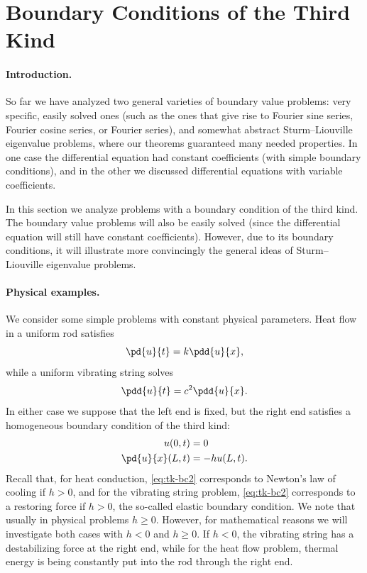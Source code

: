 \section{Boundary Conditions of the Third Kind}
\label{sec:sl-third-kind}

\paragraph{Introduction.}
So far we have analyzed two general varieties of boundary value problems: very specific, easily solved ones (such as the ones that give rise to Fourier sine series, Fourier cosine series, or Fourier series), and somewhat abstract Sturm--Liouville eigenvalue problems, where our theorems guaranteed many needed properties.  In one case the differential equation had constant coefficients (with simple boundary conditions), and in the other we discussed differential equations with variable coefficients.

In this section we analyze problems with a boundary condition of the third kind.  The boundary value problems will also be easily solved (since the differential equation will still have constant coefficients).  However, due to its boundary conditions, it will illustrate more convincingly the general ideas of Sturm--Liouville eigenvalue problems.

\paragraph{Physical examples.}
We consider some simple problems with constant physical parameters.  Heat flow in a uniform rod satisfies
\begin{equation}
\label{eq:tk-heat}
\pd{u}{t} = k\pdd{u}{x},
\end{equation}
while a uniform vibrating string solves
\begin{equation}
\label{eq:tk-wave}
\pdd{u}{t} = c^2\pdd{u}{x}.
\end{equation}
In either case we suppose that the left end is fixed, but the right end satisfies a homogeneous boundary condition of the third kind:
\begin{align}
\label{eq:tk-bc1}
u(0,t) &= 0 \\
\label{eq:tk-bc2}
\pd{u}{x}(L,t) &= -hu(L,t).
\end{align}
Recall that, for heat conduction, \eqref{eq:tk-bc2} corresponds to Newton's law of cooling if $h > 0$, and for the vibrating string problem, \eqref{eq:tk-bc2} corresponds to a restoring force if $h > 0$, the so-called elastic boundary condition.  We note that usually in physical problems $h \ge 0$.  However, for mathematical reasons we will investigate both cases with $h < 0$ and $h \ge 0$.  If $h < 0$, the vibrating string has a destabilizing force at the right end, while for the heat flow problem, thermal energy is being constantly put into the rod through the right end.

